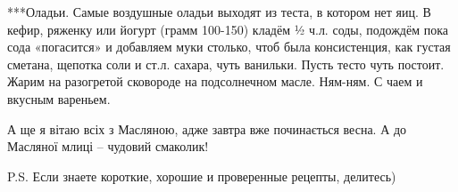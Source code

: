 ***Оладьи. Самые воздушные оладьи выходят из теста, в котором нет яиц. В кефир,
ряженку или йогурт (грамм 100-150) кладём ½ ч.л. соды, подождём пока сода
«погасится» и добавляем муки столько, чтоб была консистенция, как густая
сметана, щепотка соли и ст.л. сахара, чуть ванильки. Пусть тесто чуть постоит.
Жарим на разогретой сковороде на подсолнечном масле. Ням-ням. С чаем и вкусным
вареньем.

А ще я вітаю всіх з Масляною, адже завтра вже починається весна. А до Масляної
млиці – чудовий смаколик!

P.S. Если знаете короткие, хорошие и проверенные рецепты, делитесь)

